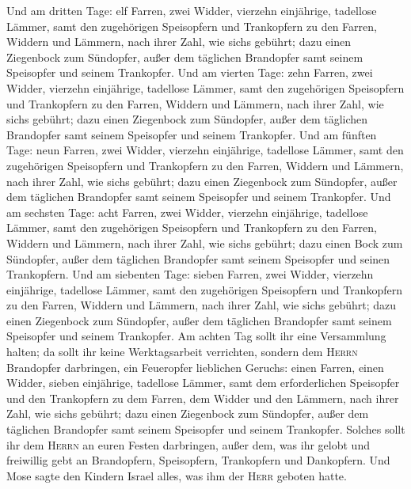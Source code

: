 Und am dritten Tage: elf Farren, zwei Widder, vierzehn
einjährige, tadellose Lämmer,  samt den zugehörigen
Speisopfern und Trankopfern zu den Farren, Widdern und Lämmern, nach
ihrer Zahl, wie sich\textquotesingle s gebührt;  dazu
einen Ziegenbock zum Sündopfer, außer dem täglichen Brandopfer samt
seinem Speisopfer und seinem Trankopfer.  Und am vierten
Tage: zehn Farren, zwei Widder,  vierzehn einjährige,
tadellose Lämmer, samt den zugehörigen Speisopfern und Trankopfern zu
den Farren, Widdern und Lämmern, nach ihrer Zahl, wie
sich\textquotesingle s gebührt;  dazu einen Ziegenbock
zum Sündopfer, außer dem täglichen Brandopfer samt seinem Speisopfer und
seinem Trankopfer.  Und am fünften Tage: neun Farren,
zwei Widder, vierzehn einjährige, tadellose Lämmer,  samt
den zugehörigen Speisopfern und Trankopfern zu den Farren, Widdern und
Lämmern, nach ihrer Zahl, wie sich\textquotesingle s gebührt;
 dazu einen Ziegenbock zum Sündopfer, außer dem täglichen
Brandopfer samt seinem Speisopfer und seinem Trankopfer. 
Und am sechsten Tage: acht Farren, zwei Widder, vierzehn einjährige,
tadellose Lämmer,  samt den zugehörigen Speisopfern und
Trankopfern zu den Farren, Widdern und Lämmern, nach ihrer Zahl, wie
sich\textquotesingle s gebührt;  dazu einen Bock zum
Sündopfer, außer dem täglichen Brandopfer samt seinem Speisopfer und
seinen Trankopfern.  Und am siebenten Tage: sieben
Farren, zwei Widder, vierzehn einjährige, tadellose Lämmer,
 samt den zugehörigen Speisopfern und Trankopfern zu den
Farren, Widdern und Lämmern, nach ihrer Zahl, wie sich\textquotesingle s
gebührt;  dazu einen Ziegenbock zum Sündopfer, außer dem
täglichen Brandopfer samt seinem Speisopfer und seinem Trankopfer.
 Am achten Tag sollt ihr eine Versammlung halten; da
sollt ihr keine Werktagsarbeit verrichten,  sondern dem
\textsc{Herrn} Brandopfer darbringen, ein Feueropfer lieblichen Geruchs:
einen Farren, einen Widder, sieben einjährige, tadellose Lämmer,
 samt dem erforderlichen Speisopfer und den Trankopfern
zu dem Farren, dem Widder und den Lämmern, nach ihrer Zahl, wie
sich\textquotesingle s gebührt;  dazu einen Ziegenbock
zum Sündopfer, außer dem täglichen Brandopfer samt seinem Speisopfer und
seinem Trankopfer.  Solches sollt ihr dem \textsc{Herrn}
an euren Festen darbringen, außer dem, was ihr gelobt und freiwillig
gebt an Brandopfern, Speisopfern, Trankopfern und Dankopfern.
 Und Mose sagte den Kindern Israel alles, was ihm der
\textsc{Herr} geboten hatte.

